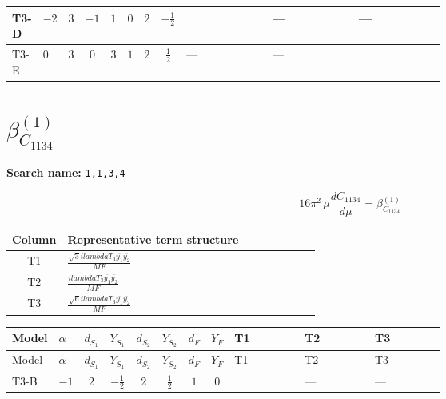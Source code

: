 \documentclass[8pt]{article}
\begin{document}
\begin{landscape}
\begin{longtable}{@{}llcccccc >{\raggedright\arraybackslash}p{0.21\linewidth} >{\raggedright\arraybackslash}p{0.21\linewidth} >{\raggedright\arraybackslash}p{0.21\linewidth}@{}}
\midrule
T3-D & $-2$ & $3$ & $-1$ & $1$ & $0$ & $2$ & $-\frac{1}{2}$ & \scriptsize\adjustbox{max width=\linewidth}{$\begin{gathered} \frac{2 \sqrt{3} lambdaT_{3} \overline{y_{1}} \overline{y_{2}}}{3 MF}\end{gathered}$} & --- & --- \\
\midrule
T3-E & $0$ & $3$ & $0$ & $3$ & $1$ & $2$ & $\frac{1}{2}$ & --- & --- & \scriptsize\adjustbox{max width=\linewidth}{$\begin{gathered} - \frac{2 \sqrt{6} lambdaT_{3} \overline{y_{1}} \overline{y_{2}}}{3 MF}\end{gathered}$} \\
\midrule
\bottomrule
\end{longtable}
\clearpage
\section*{$\beta_{C_{1134}}^{(1)}$}
\noindent\textbf{Search name: }\texttt{1,1,3,4}\par\smallskip
\[16\pi^2\,\mu\frac{d C_{1134}}{d\mu}=\beta_{C_{1134}}^{(1)}\]
\begin{center}
\begin{tabular}{@{}c >{\raggedright\arraybackslash}p{0.82\linewidth}@{}}
\toprule
Column & Representative term structure \\
\midrule
T1 & \(\displaystyle \frac{\sqrt{3} i lambdaT_{3} \overline{y_{1}} \overline{y_{2}}}{MF}\) \\
\midrule
T2 & \(\displaystyle \frac{i lambdaT_{3} \overline{y_{1}} \overline{y_{2}}}{MF}\) \\
\midrule
T3 & \(\displaystyle \frac{\sqrt{6} i lambdaT_{3} \overline{y_{1}} \overline{y_{2}}}{MF}\) \\
\midrule
\bottomrule
\end{tabular}
\end{center}
\smallskip
\tiny
\begin{longtable}{@{}llcccccc >{\raggedright\arraybackslash}p{0.21\linewidth} >{\raggedright\arraybackslash}p{0.21\linewidth} >{\raggedright\arraybackslash}p{0.21\linewidth}@{}}
\toprule
Model & $\alpha$ & $d_{S_1}$ & $Y_{S_1}$ & $d_{S_2}$ & $Y_{S_2}$ & $d_F$ & $Y_F$ & T1 & T2 & T3 \\
\midrule
\endfirsthead
\toprule
Model & $\alpha$ & $d_{S_1}$ & $Y_{S_1}$ & $d_{S_2}$ & $Y_{S_2}$ & $d_F$ & $Y_F$ & T1 & T2 & T3 \\
\midrule
\endhead
T3-B & $-1$ & $2$ & $-\frac{1}{2}$ & $2$ & $\frac{1}{2}$ & $1$ & $0$ & \scriptsize\adjustbox{max width=\linewidth}{$\begin{gathered} \frac{2 \sqrt{3} i lambdaT_{3} \overline{y_{1}} \overline{y_{2}}}{3 MF}\end{gathered}$} & --- & --- \\

\end{longtable}
\end{landscape}
\end{document}
